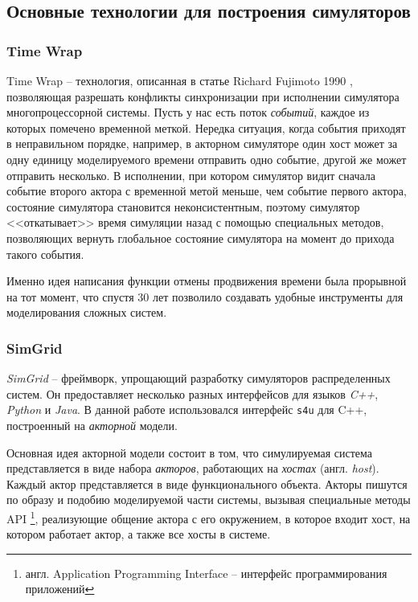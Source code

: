 \documentclass[../diploma.tex]{subfile}
\begin{document}
    \subsection{Основные технологии для построения симуляторов}
    \label{sec:review:subsec:simulation_technologies}

    \subsubsection{Time Wrap}
    
    Time Wrap -- технология, описанная в статье Richard Fujimoto 1990
    \cite{fujimoto_parallel_1990}, позволяющая разрешать конфликты синхронизации
    при исполнении симулятора многопроцессорной системы. Пусть у нас есть поток
    {\it событий}, каждое из которых помечено временной меткой. Нередка
    ситуация, когда события приходят в неправильном порядке, например, в
    акторном симуляторе один хост может за одну единицу моделируемого времени
    отправить одно событие, другой же может отправить несколько. В исполнении,
    при котором симулятор видит сначала событие второго актора с временной метой
    меньше, чем событие первого актора, состояние симулятора становится
    неконсистентным, поэтому симулятор <<откатывает>> время симуляции назад с
    помощью специальных методов, позволяющих вернуть глобальное состояние
    симулятора на момент до прихода такого события.

    Именно идея написания функции отмены продвижения времени была прорывной на
    тот момент, что спустя 30 лет позволило создавать удобные инструменты для
    моделирования сложных систем.

    \subsubsection{SimGrid}
    \label{sec:simulation_techonogies:subsec:simgrid}
    \textit{SimGrid}\cite{simgrid}\cite{simgrid_paper} -- фреймворк, упрощающий
    разработку симуляторов распределенных систем. Он предоставляет несколько
    разных интерфейсов для языков \textit{C++}, \textit{Python} и \textit{Java}.
    В данной работе использовался интерфейс \texttt{s4u} для C++, построенный на
    \textit{акторной} модели. 

    Основная идея акторной модели состоит в том, что симулируемая система
    представляется в виде набора \textit{акторов}, работающих на \textit{хостах}
    (англ. \textit{host}). Каждый актор представляется в виде функционального
    объекта. Акторы пишутся по образу и подобию моделируемой части системы,
    вызывая специальные методы API \footnote{англ. Application Programming
    Interface -- интерфейс программирования приложений}, реализующие общение
    актора с его окружением, в которое входит хост, на котором работает актор, а
    также все хосты в системе.
    
\end{document}
